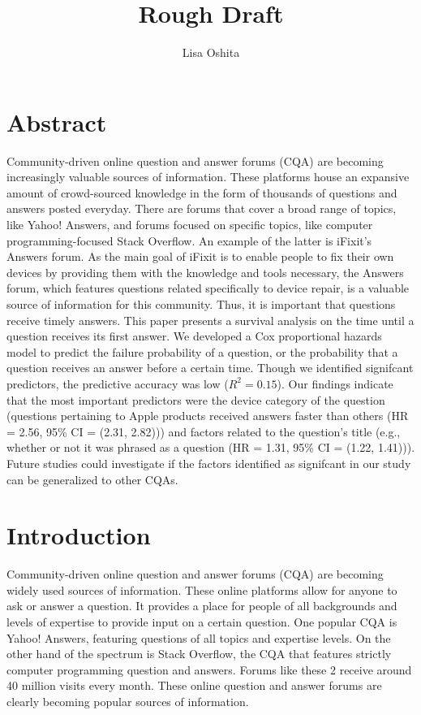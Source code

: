 \documentclass[12pt]{article}
\title{Rough Draft}
\author{Lisa Oshita}
\date{}
\begin{document}
\maketitle

\section{Abstract}

Community-driven online question and answer forums (CQA) are becoming increasingly valuable sources of information. These platforms house an expansive amount of crowd-sourced knowledge in the form of thousands of questions and answers posted everyday. There are forums that cover a broad range of topics, like Yahoo! Answers, and forums focused on specific topics, like computer programming-focused Stack Overflow. An example of the latter is iFixit's Answers forum. As the main goal of iFixit is to enable people to fix their own devices by providing them with the knowledge and tools necessary, the Answers forum, which features questions related specifically to device repair, is a valuable source of information for this community. Thus, it is important that questions receive timely answers. This paper presents a survival analysis on the time until a question receives its first answer. We developed a Cox proportional hazards model to predict the failure probability of a question, or the probability that a question receives an answer before a certain time. Though we identified signifcant predictors, the predictive accuracy was low ($R^2 = 0.15$). Our findings indicate that the most important predictors were the device category of the question (questions pertaining to Apple products received answers faster than others (HR = 2.56, 95\% CI = (2.31, 2.82))) and factors related to the question's title (e.g., whether or not it was phrased as a question (HR = 1.31, 95\% CI = (1.22, 1.41))). Future studies could investigate if the factors identified as signifcant in our study can be generalized to other CQAs. 

\section{Introduction}

    Community-driven online question and answer forums (CQA) are becoming widely used sources of information. These online platforms allow for anyone to ask or answer a question. It provides a place for people of all backgrounds and levels of expertise to provide input on a certain question. One popular CQA is Yahoo! Answers, featuring questions of all topics and expertise levels. On the other hand of the spectrum is Stack Overflow, the CQA that features strictly computer programming question and answers. Forums like these 2 receive around 40 million visits every month. These online question and answer forums are clearly becoming popular sources of information. 
    
\end{document}
